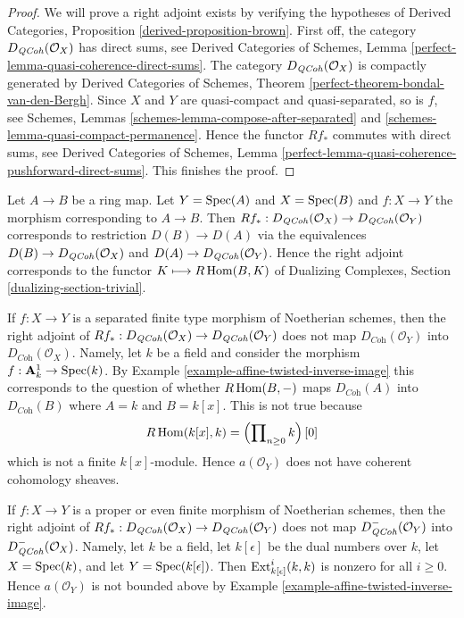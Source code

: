 \begin{proof}
We will prove a right adjoint exists by verifying the hypotheses of
Derived Categories, Proposition \ref{derived-proposition-brown}.
First off, the category $D_{\mathit{QCoh}}(\mathcal{O}_X)$ has direct sums, see
Derived Categories of Schemes, Lemma
\ref{perfect-lemma-quasi-coherence-direct-sums}.
The category $D_{\mathit{QCoh}}(\mathcal{O}_X)$ is compactly generated by
Derived Categories of Schemes, Theorem
\ref{perfect-theorem-bondal-van-den-Bergh}.
Since $X$ and $Y$ are quasi-compact and quasi-separated, so is $f$, see
Schemes, Lemmas \ref{schemes-lemma-compose-after-separated} and
\ref{schemes-lemma-quasi-compact-permanence}.
Hence the functor $Rf_*$ commutes with direct sums, see
Derived Categories of Schemes, Lemma
\ref{perfect-lemma-quasi-coherence-pushforward-direct-sums}.
This finishes the proof.
\end{proof}

\begin{example}
\label{example-affine-twisted-inverse-image}
Let $A \to B$ be a ring map. Let $Y = \mathop{\mathrm{Spec}}(A)$ and $X = \mathop{\mathrm{Spec}}(B)$
and $f : X \to Y$ the morphism corresponding to $A \to B$.
Then $Rf_* : D_{\mathit{QCoh}}(\mathcal{O}_X) \to D_{\mathit{QCoh}}(\mathcal{O}_Y)$
corresponds to restriction $D(B) \to D(A)$ via
the equivalences $D(B) \to D_{\mathit{QCoh}}(\mathcal{O}_X)$ and
$D(A) \to D_{\mathit{QCoh}}(\mathcal{O}_Y)$. Hence the right adjoint
corresponds to the functor $K \longmapsto R\mathop{\mathrm{Hom}}\nolimits(B, K)$ of
Dualizing Complexes, Section \ref{dualizing-section-trivial}.
\end{example}

\begin{example}
\label{example-does-not-preserve-coherent}
If $f : X \to Y$ is a separated finite type morphism of Noetherian schemes,
then the right adjoint of
$Rf_* : D_{\mathit{QCoh}}(\mathcal{O}_X) \to D_{\mathit{QCoh}}(\mathcal{O}_Y)$ does not map
$D_{\textit{Coh}}(\mathcal{O}_Y)$ into
$D_{\textit{Coh}}(\mathcal{O}_X)$. Namely, let $k$ be a field and
consider the morphism $f : \mathbf{A}^1_k \to \mathop{\mathrm{Spec}}(k)$. By
Example \ref{example-affine-twisted-inverse-image}
this corresponds to the question of whether
$R\mathop{\mathrm{Hom}}\nolimits(B, -)$ maps $D_{\textit{Coh}}(A)$ into $D_{\textit{Coh}}(B)$
where $A = k$ and $B = k[x]$. This is not true because
$$
R\mathop{\mathrm{Hom}}\nolimits(k[x], k) = \left(\prod\nolimits_{n \geq 0} k\right)[0]
$$
which is not a finite $k[x]$-module. Hence $a(\mathcal{O}_Y)$
does not have coherent cohomology sheaves.
\end{example}

\begin{example}
\label{example-does-not-preserve-bounded-above}
If $f : X \to Y$ is a proper or even finite morphism of Noetherian schemes,
then the right adjoint of
$Rf_* : D_{\mathit{QCoh}}(\mathcal{O}_X) \to D_{\mathit{QCoh}}(\mathcal{O}_Y)$
does not map $D_{\mathit{QCoh}}^-(\mathcal{O}_Y)$ into
$D_{\mathit{QCoh}}^-(\mathcal{O}_X)$. Namely, let $k$ be a field, let
$k[\epsilon]$ be the dual numbers over $k$, let
$X = \mathop{\mathrm{Spec}}(k)$, and let $Y = \mathop{\mathrm{Spec}}(k[\epsilon])$.
Then $\mathop{\mathrm{Ext}}\nolimits^i_{k[\epsilon]}(k, k)$ is nonzero for all $i \geq 0$.
Hence $a(\mathcal{O}_Y)$ is not bounded above
by Example \ref{example-affine-twisted-inverse-image}.
\end{example}

